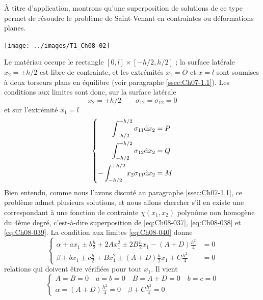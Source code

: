 À titre d'application, montrons qu'une superposition de solutions de ce type permet de résoudre le problème de Saint-Venant en contraintes ou déformations planes. 
\begin{center}
    \texttt{[image: ../images/T1\_Ch08-02]}
\end{center}
Le matériau occupe le rectangle $\left[0,l\right] \times\left [-h/2,h/2\right]$ ; la surface latérale $x_2=\pm h/2$ est libre de contrainte, et les extrémités $x_1=O$ et $x = l$ sont soumises à deux torseurs plans en équilibre (voir paragraphe \ref{ssec:Ch07-1.1}). 
Les conditions aux limites sont donc, sur la surface latérale 
\begin{equation}
  x_2 = \pm h/2 \qquad \sigma_{12} = \sigma_{12} = 0
    \label{eq:Ch08-040}
\end{equation}
et sur l'extrémité $x_1 = l$ 
\begin{equation}
  \left\{
  \begin{aligned}
     \int^{+h/2}_{-h/2}     \sigma_{11} \mathrm{d} x_2 & = P \\
     \int^{+h/2}_{-h/2}     \sigma_{12} \mathrm{d} x_2 & = Q \\
    -\int^{+h/2}_{-h/2} x_2 \sigma_{11} \mathrm{d} x_2 & = M
  \end{aligned}
  \right.
    \label{eq:Ch08-041}
\end{equation}
Bien entendu, comme nous l'avons discuté au paragraphe \ref{ssec:Ch07-1.1}, ce problème admet plusieurs solutions, et nous allons chercher s'il en existe une correspondant à une fonction de contrainte $\chi(x_1,x_2)$ polynôme non homogène du 4ème degré, c'est-à-dire superposition de \eqref{eq:Ch08-037}, \eqref{eq:Ch08-038} et \eqref{eq:Ch08-039}.
La condition aux limites \eqref{eq:Ch08-040} donne 
\begin{equation}
  \left\{
  \begin{aligned}
    \alpha +a x_1 \pm b \frac{h}{2} + 2 A x_1^2 \pm 2 B \frac{h}{2} x_1 - (A+D)\frac{h^2}{4} & = 0 \\
    \beta +b x_1 \pm c \frac{h}{2} + B x_1^2 \pm (A+D) \frac{h}{2} x_1 + C \frac{h^2}{4}&=0
  \end{aligned}
  \right.
    \label{eq:Ch08-042}
\end{equation}
relations qui doivent être vérifiées pour tout $x_1$.
Il vient
\begin{equation}
  \left\{
  \begin{aligned}
    A = B = 0 \quad a = b =0 \quad B = A+D =0 \quad b = c =0\\
    \alpha=(A+D)\frac{h^2}{4}=0 \quad \beta + C \frac{h^2}{4} =0
  \end{aligned}
  \right.
    \label{eq:Ch08-043}
\end{equation}
